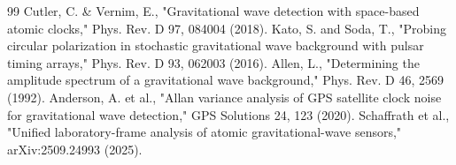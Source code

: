 \documentclass[12pt,a4paper]{article}
\begin{document}
\begin{thebibliography}{99}
 Cutler, C. \& Vernim, E., "Gravitational wave detection with space-based atomic clocks," Phys. Rev. D 97, 084004 (2018).
 Kato, S. and Soda, T., "Probing circular polarization in stochastic gravitational wave background with pulsar timing arrays," Phys. Rev. D 93, 062003 (2016).
 Allen, L., "Determining the amplitude spectrum of a gravitational wave background," Phys. Rev. D 46, 2569 (1992).
 Anderson, A. et al., "Allan variance analysis of GPS satellite clock noise for gravitational wave detection," GPS Solutions 24, 123 (2020).
 Schaffrath et al., "Unified laboratory-frame analysis of atomic gravitational-wave sensors," arXiv:2509.24993 (2025).
\end{thebibliography}
\end{document}
